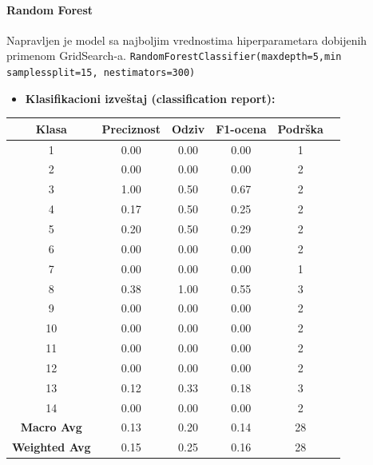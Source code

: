 \documentclass{article}
\begin{document}
\paragraph{Random Forest}
\begin{flushleft}
Napravljen je model sa najboljim vrednostima hiperparametara  dobijenih primenom GridSearch-a.
\texttt{RandomForestClassifier(max\textunderscore depth=5,min\textunderscore 
samples\textunderscore split=15, n\textunderscore estimators=300)}    
\end{flushleft}

\begin{itemize}
    \item \textbf{Klasifikacioni izveštaj (classification report):}
\end{itemize}

\begin{table}[ht]
    \centering
    \begin{tabular}{cccccc}
        \textbf{Klasa} & \textbf{Preciznost} & \textbf{Odziv} & \textbf{F1-ocena} & \textbf{Podrška} \\
        \hline
        1 & 0.00 & 0.00 & 0.00 & 1 \\
        2 & 0.00 & 0.00 & 0.00 & 2 \\
        3 & 1.00 & 0.50 & 0.67 & 2 \\
        4 & 0.17 & 0.50 & 0.25 & 2 \\
        5 & 0.20 & 0.50 & 0.29 & 2 \\
        6 & 0.00 & 0.00 & 0.00 & 2 \\
        7 & 0.00 & 0.00 & 0.00 & 1 \\
        8 & 0.38 & 1.00 & 0.55 & 3 \\
        9 & 0.00 & 0.00 & 0.00 & 2 \\
        10 & 0.00 & 0.00 & 0.00 & 2 \\
        11 & 0.00 & 0.00 & 0.00 & 2 \\
        12 & 0.00 & 0.00 & 0.00 & 2 \\
        13 & 0.12 & 0.33 & 0.18 & 3 \\
        14 & 0.00 & 0.00 & 0.00 & 2 \\
        \hline
        \textbf{Macro Avg} & 0.13 & 0.20 & 0.14 & 28 \\
        \textbf{Weighted Avg} & 0.15 & 0.25 & 0.16 & 28 \\
    \end{tabular}
    \label{tab:classification-report-random-forest}
\end{table}
\end{document}
